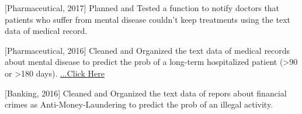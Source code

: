 \begin{cventries}
{\begin{cvitems}
        \item {[Pharmaceutical, 2017] Planned and Tested a function to notify doctors that patients who suffer from mental disease couldn't keep treatments using the text data of medical record.}
        \item {[Pharmaceutical, 2016] Cleaned and Organized the text data of medical records about mental disease to predict the prob of a long-term hospitalized patient (>90 or >180 days). \href{https://www.ibm.com/downloads/cas/VVYMQYLZ}{...Click Here}}
        \item {[Banking, 2016] Cleaned and Organized the text data of repors about financial crimes as Anti-Money-Laundering to predict the prob of an illegal activity.}
      \end{cvitems}
    }
\end{cventries}
